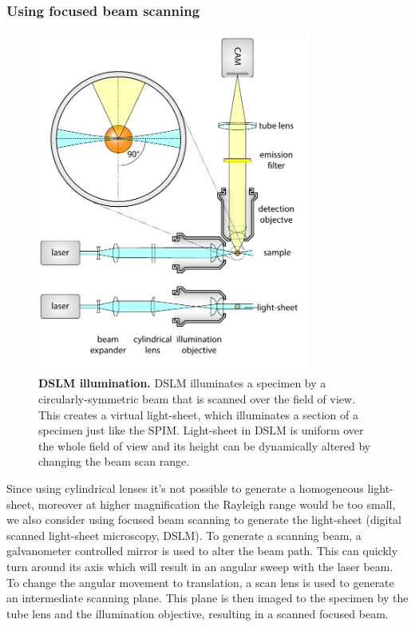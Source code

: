 \documentclass{diploma_style}
\begin{document}
\subsubsection{Using focused beam scanning}
\begin{figure}[hbt]
	\centering
	\includegraphics[page=2,width=0.8\textwidth]{figures/1_spim/spim_cyl}
	\caption{\textbf{DSLM illumination.} DSLM illuminates a specimen by a circularly-symmetric beam that is scanned over the field of view. This creates a virtual light-sheet, which illuminates a section of a specimen just like the SPIM. Light-sheet in DSLM is uniform over the whole field of view and its height can be dynamically altered by changing the beam scan range.
}
	\label{fig:dslm}
\end{figure}

Since using cylindrical lenses it's not possible to generate a homogeneous light-sheet, moreover at higher magnification the Rayleigh range would be too small, we also consider using focused beam scanning to generate the light-sheet (digital scanned light-sheet microscopy, DSLM). To generate a scanning beam, a galvanometer controlled mirror is used to alter the beam path. This can quickly turn around its axis which will result in an angular sweep with the laser beam. To change the angular movement to translation, a scan lens is used to generate an intermediate scanning plane. This plane is then imaged to the specimen by the tube lens and the illumination objective, resulting in a scanned focused beam.
\end{document}
